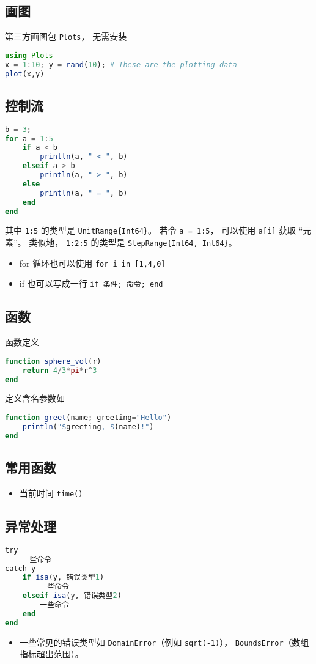 \subsection{画图}
第三方画图包 \verb`Plots`， 无需安装
\begin{lstlisting}[language=Julia]
using Plots
x = 1:10; y = rand(10); # These are the plotting data
plot(x,y)
\end{lstlisting}

\subsection{控制流}
\begin{lstlisting}[language=Julia]
b = 3;
for a = 1:5
    if a < b
        println(a, " < ", b)
    elseif a > b
        println(a, " > ", b)
    else
        println(a, " = ", b)
    end
end
\end{lstlisting}
其中 \verb`1:5` 的类型是 \verb`UnitRange{Int64}`。 若令 \verb`a = 1:5`， 可以使用 \verb`a[i]` 获取 “元素”。 类似地， \verb`1:2:5` 的类型是 \verb`StepRange{Int64, Int64}`。

\begin{itemize}
\item for 循环也可以使用 \verb`for i in [1,4,0]`
\item if 也可以写成一行 \verb`if 条件; 命令; end`
\end{itemize}

\subsection{函数}
函数定义
\begin{lstlisting}[language=julia]
function sphere_vol(r)
    return 4/3*pi*r^3
end
\end{lstlisting}

定义含名参数如
\begin{lstlisting}[language=julia]
function greet(name; greeting="Hello")
    println("$greeting, $(name)!")
end
\end{lstlisting}

\subsection{常用函数}
\begin{itemize}
\item 当前时间 \verb`time()`
\end{itemize}

\subsection{异常处理}
\begin{lstlisting}[language=julia]
try 
    一些命令
catch y
    if isa(y, 错误类型1)
        一些命令
    elseif isa(y, 错误类型2)
        一些命令
    end
end
\end{lstlisting}
\begin{itemize}
\item 一些常见的错误类型如 \verb`DomainError`（例如 \verb`sqrt(-1)`）， \verb`BoundsError`（数组指标超出范围）。
\end{itemize}



